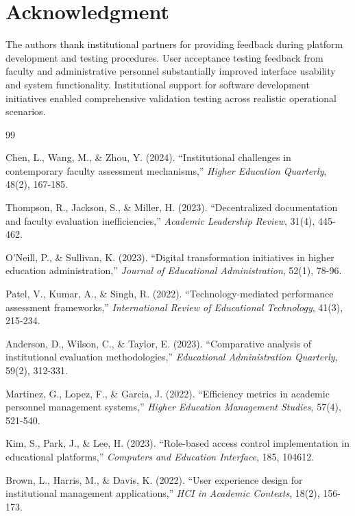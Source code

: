 \documentclass[conference]{IEEEtran}
\begin{document}
\section*{Acknowledgment}

The authors thank institutional partners for providing feedback during platform development and testing procedures. User acceptance testing feedback from faculty and administrative personnel substantially improved interface usability and system functionality. Institutional support for software development initiatives enabled comprehensive validation testing across realistic operational scenarios.

\begin{thebibliography}{99}

 Chen, L., Wang, M., \& Zhou, Y. (2024). ``Institutional challenges in contemporary faculty assessment mechanisms,'' \textit{Higher Education Quarterly}, 48(2), 167-185.

 Thompson, R., Jackson, S., \& Miller, H. (2023). ``Decentralized documentation and faculty evaluation inefficiencies,'' \textit{Academic Leadership Review}, 31(4), 445-462.

 O'Neill, P., \& Sullivan, K. (2023). ``Digital transformation initiatives in higher education administration,'' \textit{Journal of Educational Administration}, 52(1), 78-96.

 Patel, V., Kumar, A., \& Singh, R. (2022). ``Technology-mediated performance assessment frameworks,'' \textit{International Review of Educational Technology}, 41(3), 215-234.

 Anderson, D., Wilson, C., \& Taylor, E. (2023). ``Comparative analysis of institutional evaluation methodologies,'' \textit{Educational Administration Quarterly}, 59(2), 312-331.

 Martinez, G., Lopez, F., \& Garcia, J. (2022). ``Efficiency metrics in academic personnel management systems,'' \textit{Higher Education Management Studies}, 57(4), 521-540.

 Kim, S., Park, J., \& Lee, H. (2023). ``Role-based access control implementation in educational platforms,'' \textit{Computers and Education Interface}, 185, 104612.

 Brown, L., Harris, M., \& Davis, K. (2022). ``User experience design for institutional management applications,'' \textit{HCI in Academic Contexts}, 18(2), 156-173.


\end{thebibliography}
\end{document}
